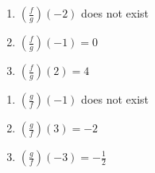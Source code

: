 \documentclass{ximera}
\begin{document}
\begin{multicols}{3}
\begin{enumerate}
\setcounter{enumi}{\value{HW}}

\item $\left(\frac{f}{g}\right)(-2)$ does not exist
\item $\left(\frac{f}{g}\right)(-1) = 0$
\item $\left(\frac{f}{g}\right)(2) = 4$

\setcounter{HW}{\value{enumi}}
\end{enumerate}
\end{multicols}

\begin{multicols}{3}
\begin{enumerate}
\setcounter{enumi}{\value{HW}}

\item $\left(\frac{g}{f}\right)(-1)$ does not exist
\item $\left(\frac{g}{f}\right)(3) = -2$ 
\item $\left(\frac{g}{f}\right)(-3) = -\frac{1}{2}$ 

\setcounter{HW}{\value{enumi}}
\end{enumerate}
\end{multicols}
\end{document}
